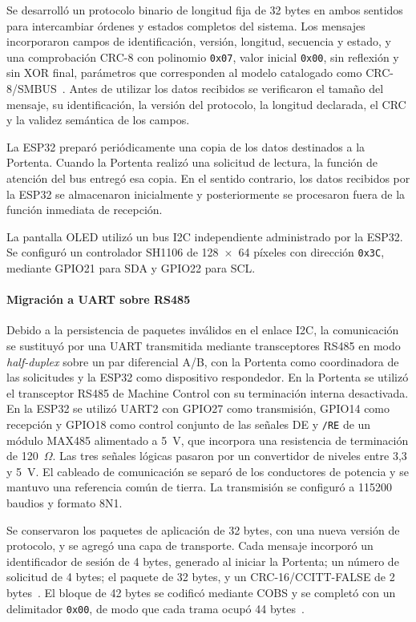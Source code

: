 Se desarrolló un protocolo binario de longitud fija de 32 bytes en ambos sentidos para intercambiar órdenes y estados completos del sistema. Los mensajes incorporaron campos de identificación, versión, longitud, secuencia y estado, y una comprobación CRC-8 con polinomio \texttt{0x07}, valor inicial \texttt{0x00}, sin reflexión y sin XOR final, parámetros que corresponden al modelo catalogado como CRC-8/SMBUS~\cite{reveng2023crc}. Antes de utilizar los datos recibidos se verificaron el tamaño del mensaje, su identificación, la versión del protocolo, la longitud declarada, el CRC y la validez semántica de los campos.

La ESP32 preparó periódicamente una copia de los datos destinados a la Portenta. Cuando la Portenta realizó una solicitud de lectura, la función de atención del bus entregó esa copia. En el sentido contrario, los datos recibidos por la ESP32 se almacenaron inicialmente y posteriormente se procesaron fuera de la función inmediata de recepción.

La pantalla OLED utilizó un bus I2C independiente administrado por la ESP32. Se configuró un controlador SH1106 de 128~$\times$~64 píxeles con dirección \texttt{0x3C}, mediante GPIO21 para SDA y GPIO22 para SCL.

\paragraph{Migración a UART sobre RS485} Debido a la persistencia de paquetes inválidos en el enlace I2C, la comunicación se sustituyó por una UART transmitida mediante transceptores RS485 en modo \textit{half-duplex} sobre un par diferencial A/B, con la Portenta como coordinadora de las solicitudes y la ESP32 como dispositivo respondedor. En la Portenta se utilizó el transceptor RS485 de Machine Control con su terminación interna desactivada. En la ESP32 se utilizó UART2 con GPIO27 como transmisión, GPIO14 como recepción y GPIO18 como control conjunto de las señales DE y \texttt{/RE} de un módulo MAX485 alimentado a 5~V, que incorpora una resistencia de terminación de 120~$\Omega$. Las tres señales lógicas pasaron por un convertidor de niveles entre 3,3 y 5~V. El cableado de comunicación se separó de los conductores de potencia y se mantuvo una referencia común de tierra. La transmisión se configuró a 115200 baudios y formato 8N1.

Se conservaron los paquetes de aplicación de 32 bytes, con una nueva versión de protocolo, y se agregó una capa de transporte. Cada mensaje incorporó un identificador de sesión de 4 bytes, generado al iniciar la Portenta; un número de solicitud de 4 bytes; el paquete de 32 bytes, y un CRC-16/CCITT-FALSE de 2 bytes~\cite{reveng2023crc}. El bloque de 42 bytes se codificó mediante COBS y se completó con un delimitador \texttt{0x00}, de modo que cada trama ocupó 44 bytes~\cite{cheshire1999cobs}.

